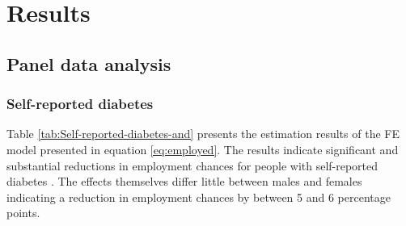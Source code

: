\section{\label{sec:RESULTS} Results}


\subsection{Panel data analysis}

\subsubsection*{Self-reported diabetes}

Table \ref{tab:Self-reported-diabetes-and} presents the estimation results of the \ac{FE} model presented in equation \ref{eq:employed}. The results indicate significant and substantial
reductions in employment chances for people with self-reported diabetes
. The effects themselves
differ little between males and females indicating a reduction in
employment chances by between 5 and 6 percentage points. 
